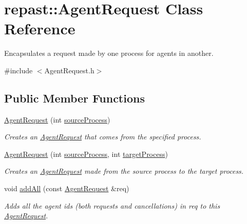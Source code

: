 \hypertarget{classrepast_1_1_agent_request}{\section{repast\-:\-:Agent\-Request Class Reference}
\label{classrepast_1_1_agent_request}
}


Encapsulates a request made by one process for agents in another.  




{\ttfamily \#include $<$Agent\-Request.\-h$>$}

\subsection*{Public Member Functions}
\begin{DoxyCompactItemize}
\item 
\hyperlink{classrepast_1_1_agent_request_a7fcf54013c3f90c22c52fe26b1f2e355}{Agent\-Request} (int \hyperlink{classrepast_1_1_agent_request_afd2499472864d7d8eb2780fd02baf372}{source\-Process})
\begin{DoxyCompactList}\small\item\em Creates an \hyperlink{classrepast_1_1_agent_request}{Agent\-Request} that comes from the specified process. \end{DoxyCompactList}\item 
\hyperlink{classrepast_1_1_agent_request_a1e302fac20c183af00fd12b669f4f973}{Agent\-Request} (int \hyperlink{classrepast_1_1_agent_request_afd2499472864d7d8eb2780fd02baf372}{source\-Process}, int \hyperlink{classrepast_1_1_agent_request_a19abc9909ceeb4870c07b638e19d6672}{target\-Process})
\begin{DoxyCompactList}\small\item\em Creates an \hyperlink{classrepast_1_1_agent_request}{Agent\-Request} made from the source process to the target process. \end{DoxyCompactList}\item 
void \hyperlink{classrepast_1_1_agent_request_a4ac5995bd89cc5fde63ac0aa5bfaafd2}{add\-All} (const \hyperlink{classrepast_1_1_agent_request}{Agent\-Request} \&req)
\begin{DoxyCompactList}\small\item\em Adds all the agent ids (both requests and cancellations) in req to this \hyperlink{classrepast_1_1_agent_request}{Agent\-Request}. \end{DoxyCompactList}\item 

\end{DoxyCompactItemize}
